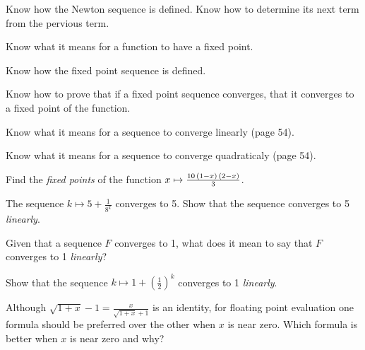 \documentclass[12pt,fleqn]{exam}
\begin{document}
\begin{questions}


\question Know how the Newton  sequence is defined. Know how to determine its next term from the pervious term.

\question Know what it means for a function to have a fixed point.

\question Know how the fixed point sequence is defined. 

\question Know how to prove that if a fixed point sequence converges, that it converges to a fixed point of the
function.


\question Know what it means for a sequence to converge linearly (page 54).  


\question Know what it means for a sequence to converge quadraticaly  (page 54).  






\question Find the \emph{fixed points} of the function \(x \mapsto {{10\,\left(1-x\right)\,\left(2-x\right)}\over{3}}\).




\question  The sequence  \(\displaystyle k \mapsto 5 + \frac{1}{8^k} \) converges to 5. Show that the sequence 
 converges to 5 \emph{linearly}.






\question Given that a sequence \(F\) converges to 1, what does it mean to say that \(F\) converges to 1 \emph{linearly}?


\question Show that the sequence \(\displaystyle k \mapsto 1 + \left(\frac{1}{2} \right)^k \) converges to 1 \emph{linearly}.




\question  Although \(\displaystyle \sqrt{1+x} - 1 =
\frac{x}{\sqrt{1+x} + 1}\) is an identity, for floating point
evaluation one formula should be
preferred over the other when \(x\) is near zero.
Which formula is better when \(x\) is near zero
and why?
\end{questions}
\end{document}
